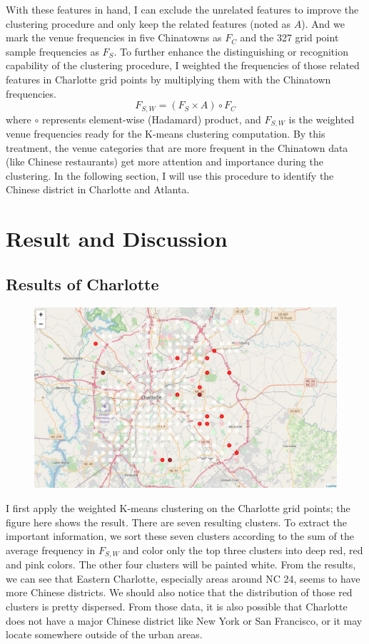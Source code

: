 \documentclass{article}
\begin{document}
With these features in hand, I can exclude the unrelated features to improve the clustering procedure and only keep the related features (noted as $A$).
And we mark the venue frequencies in five Chinatowns as $F_C$ and the 327 grid point sample frequencies as $F_S$.
To further enhance the distinguishing or recognition capability of the clustering procedure, I weighted the frequencies of those related features in Charlotte grid points by multiplying them with the Chinatown frequencies.
$$ F_{S, W} = (F_S \times A) \circ F_C $$
where $\circ$ represents element-wise (Hadamard) product, and $F_{S, W}$ is the weighted venue frequencies ready for the K-means clustering computation.
By this treatment, the venue categories that are more frequent in the Chinatown data (like Chinese restaurants) get more attention and importance during the clustering.
In the following section, I will use this procedure to identify the Chinese district in Charlotte and Atlanta.

\section{Result and Discussion}

\subsection{Results of Charlotte}

\begin{figure}[h!]
\includegraphics[width=1.0\textwidth]{cn4.jpg}
\centering
\end{figure}

I first apply the weighted K-means clustering on the Charlotte grid points; the figure here shows the result.
There are seven resulting clusters.
To extract the important information, we sort these seven clusters according to the sum of the average frequency in $F_{S, W}$ and color only the top three clusters into deep red, red and pink colors.
The other four clusters will be painted white.
From the results, we can see that Eastern Charlotte, especially areas around NC 24, seems to have more Chinese districts.
We should also notice that the distribution of those red clusters is pretty dispersed.
From those data, it is also possible that Charlotte does not have a major Chinese district like New York or San Francisco, or it may locate somewhere outside of the urban areas.
\end{document}
